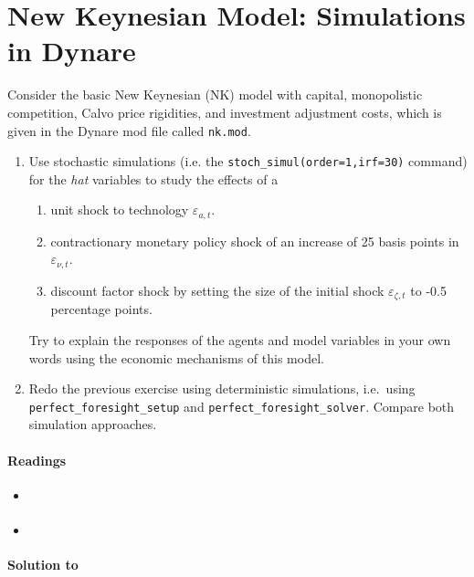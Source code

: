 \section[Basic New Keynesian Model: Simulations in Dynare]{New Keynesian Model: Simulations in Dynare\label{ex:NewKeynesianModelSimulationsDynare}}
Consider the basic New Keynesian (NK) model with capital, monopolistic competition, Calvo price rigidities, and investment adjustment costs,
  which is given in the Dynare mod file called \texttt{nk.mod}.

\begin{enumerate}

\item Use stochastic simulations (i.e. the \texttt{stoch\_simul(order=1,irf=30)} command) for the \emph{hat} variables to study the effects of a
\begin{enumerate}
  \item unit shock to technology $\varepsilon_{a,t}$.
  \item contractionary monetary policy shock of an increase of 25 basis points in $\varepsilon_{\nu,t}$.
  \item discount factor shock by setting the size of the initial shock $\varepsilon_{\zeta,t}$ to -0.5 percentage points.
\end{enumerate}
Try to explain the responses of the agents and model variables in your own words using the economic mechanisms of this model.

\item Redo the previous exercise using deterministic simulations,
  i.e.\ using \texttt{perfect\_foresight\_setup} and \texttt{perfect\_foresight\_solver}.
Compare both simulation approaches.
\end{enumerate}

\paragraph{Readings}
\begin{itemize}
  \item \textcite[Ch.~3]{Gali_2015_MonetaryPolicyInflation}
  \item \textcite{Rupert.Sustek_2019_MechanicsNewKeynesianModels}	
\end{itemize}

\begin{solution}\textbf{Solution to }
\ifDisplaySolutions

\fi
\newpage
\end{solution}